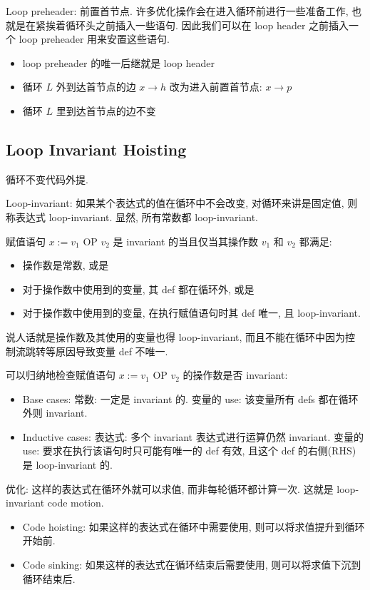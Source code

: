 Loop preheader: 前置首节点. 许多优化操作会在进入循环前进行一些准备工作, 也就是在紧挨着循环头之前插入一些语句. 因此我们可以在 loop header 之前插入一个 loop preheader 用来安置这些语句. 
\begin{itemize}
    \item loop preheader 的唯一后继就是 loop header
    \item 循环 $L$ 外到达首节点的边 $x\to h$ 改为进入前置首节点: $x\to p$
    \item 循环 $L$ 里到达首节点的边不变
\end{itemize}

\subsection{Loop Invariant Hoisting}
循环不变代码外提.

Loop-invariant: 如果某个表达式的值在循环中不会改变, 对循环来讲是固定值, 则称表达式 loop-invariant. 显然, 所有常数都 loop-invariant. 

赋值语句 $x := v_1\text{ OP }v_2$  是 invariant 的当且仅当其操作数 $v_1$ 和 $v_2$ 都满足: 
\begin{itemize}
    \item 操作数是常数, 或是
    \item 对于操作数中使用到的变量, 其 def 都在循环外, 或是
    \item 对于操作数中使用到的变量, 在执行赋值语句时其 def 唯一, 且 loop-invariant.
\end{itemize}
说人话就是操作数及其使用的变量也得 loop-invariant, 而且不能在循环中因为控制流跳转等原因导致变量 def 不唯一. 


可以归纳地检查赋值语句 $x := v_1\text{ OP }v_2$ 的操作数是否 invariant:
\begin{itemize}
    \item Base cases:
    \subitem 常数: 一定是 invariant 的. 
    \subitem 变量的 use: 该变量所有 defs 都在循环外则 invariant.
    \item Inductive cases:
    \subitem 表达式: 多个 invariant 表达式进行运算仍然 invariant.
    \subitem 变量的 use: 要求在执行该语句时只可能有唯一的 def 有效, 且这个 def 的右侧(RHS) 是 loop-invariant 的. 
\end{itemize}

优化: 这样的表达式在循环外就可以求值, 而非每轮循环都计算一次. 这就是 loop-invariant code motion.
\begin{itemize}
    \item Code hoisting: 如果这样的表达式在循环中需要使用, 则可以将求值提升到循环开始前. 
    \item Code sinking: 如果这样的表达式在循环结束后需要使用, 则可以将求值下沉到循环结束后. 
\end{itemize}

